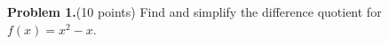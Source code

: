 \documentclass[12pt]{article}
\date{September 24, 2014}
\begin{document}
\bigskip

\vspace{.5in}

{\bf Problem 1.}(10 points)  Find and simplify the difference quotient for $f(x) = x^2 - x$.
\end{document}
